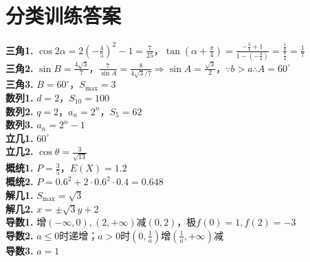 \documentclass[12pt,a4paper]{ctexbook}
\begin{document}
\chapter{分类训练答案}
\textbf{三角1.} $\cos2\alpha=2(-\frac45)^2-1=\frac{7}{25}$，$\tan(\alpha+\frac{\pi}{4})=\frac{-\frac34+1}{1-(-\frac34)}=\frac{\frac14}{\frac74}=\frac17$\\
\textbf{三角2.} $\sin B=\frac{4\sqrt3}{7}$，$\frac{7}{\sin A}=\frac{8}{4\sqrt3/7}\Rightarrow\sin A=\frac{\sqrt3}{2}$，$\because b>a\therefore A=60^\circ$\\
\textbf{三角3.} $B=60^\circ$，$S_{\max}=3$\\
\textbf{数列1.} $d=2$，$S_{10}=100$\\
\textbf{数列2.} $q=2$，$a_n=2^n$，$S_5=62$\\
\textbf{数列3.} $a_n=2^n-1$\\
\textbf{立几1.} $60^\circ$\\
\textbf{立几2.} $\cos\theta=\frac{3}{\sqrt{13}}$\\
\textbf{概统1.} $P=\frac35$，$E(X)=1.2$\\
\textbf{概统2.} $P=0.6^2+2\cdot0.6^2\cdot0.4=0.648$\\
\textbf{解几1.} $S_{\max}=\sqrt3$\\
\textbf{解几2.} $x=\pm\sqrt3 y+2$\\
\textbf{导数1.} 增$(-\infty,0),(2,+\infty)$减$(0,2)$，极$f(0)=1,f(2)=-3$\\
\textbf{导数2.} $a\le0$时递增；$a>0$时$(0,\frac1a)$增$(\frac1a,+\infty)$减\\
\textbf{导数3.} $a=1$
\end{document}
